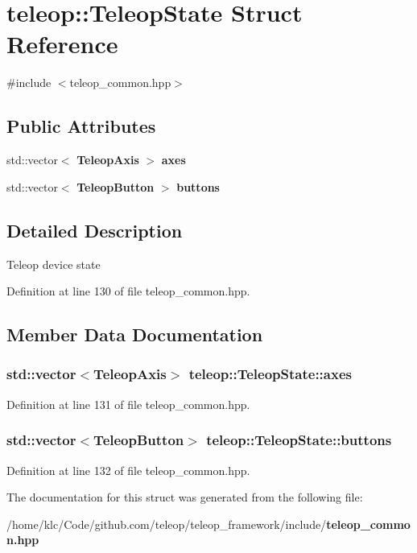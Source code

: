 \section{teleop::TeleopState Struct Reference}
\label{structteleop_1_1TeleopState}


{\ttfamily \#include $<$teleop\_\-common.hpp$>$}

\subsection*{Public Attributes}
\begin{DoxyCompactItemize}
\item 
std::vector$<$ {\bf TeleopAxis} $>$ {\bf axes}
\item 
std::vector$<$ {\bf TeleopButton} $>$ {\bf buttons}
\end{DoxyCompactItemize}


\subsection{Detailed Description}
Teleop device state 

Definition at line 130 of file teleop\_\-common.hpp.



\subsection{Member Data Documentation}
\subsubsection[{axes}]{\setlength{\rightskip}{0pt plus 5cm}std::vector$<${\bf TeleopAxis}$>$ {\bf teleop::TeleopState::axes}}\label{structteleop_1_1TeleopState_a0d5d8ad57cb592bb92087febfbe56c3f}


Definition at line 131 of file teleop\_\-common.hpp.

\subsubsection[{buttons}]{\setlength{\rightskip}{0pt plus 5cm}std::vector$<${\bf TeleopButton}$>$ {\bf teleop::TeleopState::buttons}}\label{structteleop_1_1TeleopState_a547375b52aee503d2d22d9013d3952e6}


Definition at line 132 of file teleop\_\-common.hpp.



The documentation for this struct was generated from the following file:\begin{DoxyCompactItemize}
\item 
/home/klc/Code/github.com/teleop/teleop\_\-framework/include/{\bf teleop\_\-common.hpp}\end{DoxyCompactItemize}
